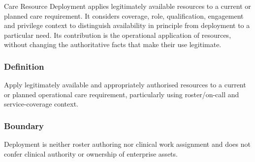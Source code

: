 Care Resource Deployment applies legitimately available resources to a current or planned care requirement. It considers coverage, role, qualification, engagement and privilege context to distinguish availability in principle from deployment to a particular need. Its contribution is the operational application of resources, without changing the authoritative facts that make their use legitimate.

\subsubsection*{Definition}

Apply legitimately available and appropriately authorised resources to a current or planned operational care requirement, particularly using roster/\allowbreak{}on-call and service-coverage context.

\subsubsection*{Boundary}

Deployment is neither roster authoring nor clinical work assignment and does not confer clinical authority or ownership of enterprise assets.

